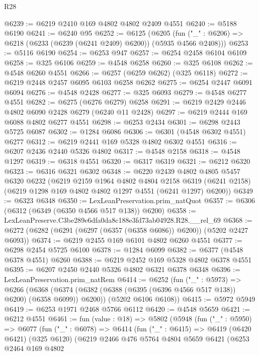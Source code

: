 \begin{lexlean}{R28}
\begin{coremodule}
@6239 := @6219 @2410 @169 @4802 @4802 @2409 @4551
@6240 := @5188 @6190
@6241 := @6240 @95
@6252 := @6125
    (@6205 (fun ("_" : @6206) => @6218 (@6233 (@6239 (@6241 @2409) @6200)) (@5935 @4566 @2408)))
@6253 := @5116 @6190
@6254 := @6253 @947
@6257 := @6254 @2458 @6104 @6109
@6258 := @325 @6106
@6259 := @4548 @6258
@6260 := @325 @6108
@6262 := @4548 @6260 @4551
@6266 := @6257 (@6259 @6262) (@325 @6118)
@6272 := @6219 @2448 @2457 @6095 @6103 @6258 @6262
@6275 := @6254 @2447 @6091 @6094
@6276 := @4548 @2428
@6277 := @325 @6093
@6279 := @4548 @6277 @4551
@6282 := @6275 (@6276 @6279) @6258
@6291 := @6219 @2429 @2446 @4802 @6090 @2428 @6279 (@6240 @11 @2428)
@6297 := @6219 @2444 @169 @6088 @4802 @6277 @4551
@6298 := @6253 @2434
@6301 := @6298 @2443 @5725 @6087
@6302 := @1284 @6086
@6306 := @6301 (@4548 @6302 @4551) @6277
@6312 := @6219 @2441 @169 @5328 @4802 @6302 @4551
@6316 := @6207 @2436 @2440 @5326 @4802
@6317 := @4548 @2158
@6318 := @4548 @1297
@6319 := @6318 @4551
@6320 := @6317 @6319
@6321 := @6212 @6320
@6323 := @6316 @6321 @6302
@6348 := @6220
    @2439
    @4802
    @4805
    @5457
    @6320
    @6232
    (@6219
      @2159
      @1964
      @4802
      @4804
      @2158
      @6319
      (@6241 @2158)
      (@6219 @1298 @169 @4802 @4802 @1297 @4551 (@6241 @1297) @6200))
@6349 := @6323 @6348
@6350 := LexLeanPreservation.prim_natQuot
@6357 := @6306 (@6312 (@6349 (@6350 @4566 @517 @138)) @6200)
@6358 := LexLeanPreserve.C3be289e6dfa0da8c188e3fd73ab04928.R28.__rel_69
@6368 := @6272 (@6282 (@6291 (@6297 (@6357 (@6358 @6086)) @6200)) (@5202 @2427 @6093))
@6374 := @6219 @2455 @169 @6101 @4802 @6260 @4551
@6377 := @6298 @2454 @5725 @6100
@6378 := @1284 @6099
@6382 := @6377 (@4548 @6378 @4551) @6260
@6388 := @6219 @2452 @169 @5328 @4802 @6378 @4551
@6395 := @6207 @2450 @2440 @5326 @4802 @6321 @6378 @6348
@6396 := LexLeanPreservation.prim_natRem
@6414 := @6252
    (fun ("_" : @5973) =>
    @6266
      (@6368 (@6374 (@6382 (@6388 (@6395 (@6396 @4566 @517 @138)) @6200) (@6358 @6099)) @6200))
      (@5202 @6106 @6108))
@6415 := @5972 @5949
@6419 := @6253 @1971 @2468 @5766 @6112
@6420 := @4548 @5659
@6421 := @6212 @4551
@6461 := fun (value : @18) =>
  @5802
    (@5948
      (fun ("_" : @5950) =>
      @6077
        (fun ("_" : @6078) =>
        @6414
          (fun ("_" : @6415) =>
          @6419
            (@6420 @6421)
            (@325 @6120)
            (@6219
              @2466
              @476
              @5764
              @4804
              @5659
              @6421
              (@6253
                @2464
                @169
                @4802

\end{coremodule}
\end{lexlean}
